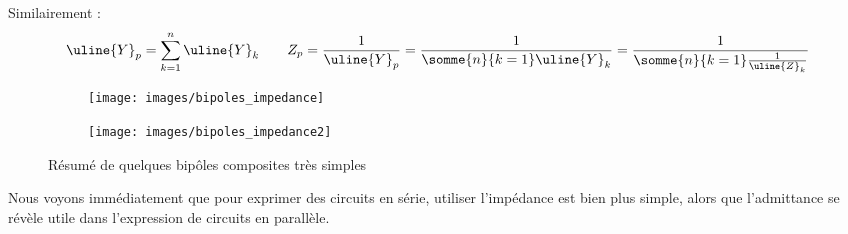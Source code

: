 \documentclass[12pt,a4paper]{article}
\newcommand{\uz}{\uline{Z} }
\newcommand{\uy}{\uline{Y} }
\begin{document}
 Similairement :
\begin{equation}	
	\uy_p = \sum_{k=1}^n \uy_k \qquad {Z}_p = \frac{1}{\uy_p} = \frac{1}{\somme{n}{k=1}\uy_k} =  \frac{1}{\somme{n}{k=1} \frac{1}{\uz_k}}
	\label{equ: mise parallele impedance/admittance}
\end{equation}

\begin{figure}[!h]
	\centering
	\begin{subfigure}[b]{0.45\textwidth}
		\centering
		\texttt{[image: images/bipoles\_impedance]}
	\end{subfigure}
	\begin{subfigure}[b]{0.45\textwidth}
		\centering
		\texttt{[image: images/bipoles\_impedance2]}
	\end{subfigure}
	\caption{Résumé de quelques bipôles composites très simples}
	\label{figs: resume bipole composite}
\end{figure}
Nous voyons immédiatement que pour exprimer des circuits en série, utiliser l'impédance est bien plus simple, alors que l'admittance se révèle utile dans l'expression de circuits en parallèle. 
\end{document}
